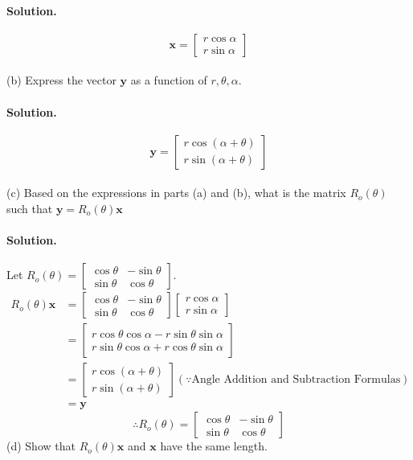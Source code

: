 \paragraph{Solution.}
$$\mathbf{x} = \begin{bmatrix}
    r\cos\alpha\\r\sin\alpha
\end{bmatrix}$$\\

(b) Express the vector $\mathbf{y}$ as a function of $r,\theta,\alpha$.
\paragraph{Solution.}
$$\mathbf{y} = \begin{bmatrix}
    r\cos(\alpha+\theta)\\r\sin(\alpha+\theta)
\end{bmatrix}$$\\

(c) Based on the expressions in parts (a) and (b), what is the matrix $R_o(\theta)$ such that $\mathbf{y}=R_o(\theta)\mathbf{x}$
\paragraph{Solution.}
Let $R_o(\theta) = \begin{bmatrix}
    \cos\theta & -\sin\theta\\
    \sin\theta & \cos\theta
\end{bmatrix}$.
\begin{align*}
    R_o(\theta)\mathbf{x} &= \begin{bmatrix}
        \cos\theta & -\sin\theta\\
        \sin\theta & \cos\theta
    \end{bmatrix} \begin{bmatrix}
        r\cos\alpha\\r\sin\alpha
    \end{bmatrix}\\
    &= \begin{bmatrix}
        r\cos\theta\cos\alpha - r\sin\theta\sin\alpha\\
        r\sin\theta\cos\alpha + r\cos\theta\sin\alpha
    \end{bmatrix}\\
    &= \begin{bmatrix}
        r\cos(\alpha+\theta)\\r\sin(\alpha+\theta)
    \end{bmatrix} (\because \text{Angle Addition and Subtraction Formulas})\\
    &= \mathbf{y}
\end{align*}
$$\therefore R_o(\theta) = \begin{bmatrix}
    \cos\theta & -\sin\theta\\
    \sin\theta & \cos\theta
\end{bmatrix}$$
\newpage
(d) Show that $R_o(\theta)\mathbf{x}$ and $\mathbf{x}$ have the same length.
